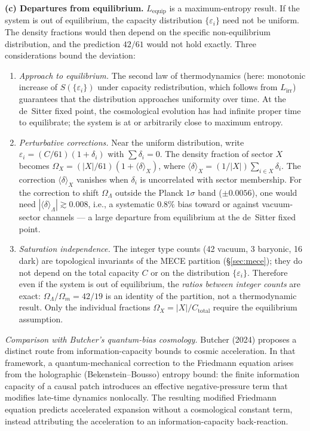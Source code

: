 \documentclass[11pt,a4paper]{article}
\theoremstyle{definition}
\newcommand{\eps}{\varepsilon}
\begin{document}
\smallskip\noindent\textbf{(c) Departures from equilibrium.}\quad
$L_{\mathrm{equip}}$ is a maximum-entropy result.  If the system is
out of equilibrium, the capacity distribution $\{\eps_i\}$ need not
be uniform.  The density fractions would then depend on the specific
non-equilibrium distribution, and the prediction $42/61$ would not
hold exactly.  Three considerations bound the deviation:
\begin{enumerate}[label=(\alph*),nosep]
  \item \textit{Approach to equilibrium.}\quad
  The second law of thermodynamics (here: monotonic increase of
  $S(\{\eps_i\})$ under capacity redistribution, which follows from
  $L_{\mathrm{irr}}$) guarantees that the distribution approaches
  uniformity over time.  At the de~Sitter fixed point, the
  cosmological evolution has had infinite proper time to equilibrate;
  the system is at or arbitrarily close to maximum entropy.

  \item \textit{Perturbative corrections.}\quad
  Near the uniform distribution, write
  $\eps_i = (C/61)(1 + \delta_i)$ with $\sum \delta_i = 0$.  The
  density fraction of sector $X$ becomes
  $\Omega_X = (|X|/61)(1 + \langle\delta\rangle_X)$, where
  $\langle\delta\rangle_X = (1/|X|)\sum_{i \in X} \delta_i$.
  The correction $\langle\delta\rangle_X$ vanishes when $\delta_i$ is
  uncorrelated with sector membership.  For the correction to shift
  $\Omega_\Lambda$ outside the Planck $1\sigma$ band ($\pm 0.0056$),
  one would need $|\langle\delta\rangle_\Lambda| \gtrsim 0.008$,
  i.e., a systematic $0.8\%$ bias toward or against vacuum-sector
  channels --- a large departure from equilibrium at the de~Sitter
  fixed point.

  \item \textit{Saturation independence.}\quad
  The integer type counts (42 vacuum, 3 baryonic, 16 dark) are
  topological invariants of the MECE partition
  (\S\ref{sec:mece}); they do not depend on the total capacity
  $C$ or on the distribution $\{\eps_i\}$.  Therefore even if
  the system is out of equilibrium, the \emph{ratios between
  integer counts} are exact: $\Omega_\Lambda / \Omega_m = 42/19$
  is an identity of the partition, not a thermodynamic result.
  Only the individual fractions $\Omega_X = |X| / C_{\mathrm{total}}$
  require the equilibrium assumption.
\end{enumerate}

\smallskip\noindent\textit{Comparison with Butcher's quantum-bias
cosmology.}\quad
Butcher (2024) proposes a distinct route from information-capacity
bounds to cosmic acceleration.  In that framework, a quantum-mechanical
correction to the Friedmann equation arises from the holographic
(Bekenstein--Bousso) entropy bound: the finite information capacity of
a causal patch introduces an effective negative-pressure term that
modifies late-time dynamics nonlocally.  The resulting modified Friedmann
equation predicts accelerated expansion without a cosmological constant
term, instead attributing the acceleration to an information-capacity
back-reaction.
\end{document}

